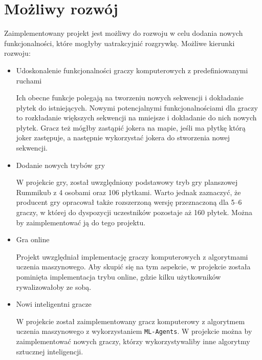 \documentclass[a4paper,twoside,12pt]{book}
\begin{document}
	\section{Możliwy rozwój}%
	Zaimplementowany projekt jest możliwy do rozwoju w celu dodania nowych funkcjonalności, które mogłyby uatrakcyjnić rozgrywkę. Możliwe kierunki rozwoju:
	\begin{itemize}
		\item Udoskonalenie funkcjonalności graczy komputerowych z predefiniowanymi ruchami 
		
		Ich obecne funkcje polegają na tworzeniu nowych sekwencji i dokładanie płytek do istniejących. Nowymi potencjalnymi funkcjonalnościami dla graczy to rozkładanie większych sekwencji na mniejsze i dokładanie do nich nowych płytek. Gracz też mógłby zastąpić jokera na mapie, jeśli ma płytkę którą joker zastępuje, a następnie wykorzystać jokera do stworzenia nowej sekwencji.
		
		\item Dodanie nowych trybów gry
		
		W projekcie gry, został uwzględniony podstawowy tryb gry planszowej Rummikub z 4 osobami oraz 106 płytkami. Warto jednak zaznaczyć, że producent gry opracował także rozszerzoną wersję przeznaczoną dla 5–6 graczy, w której do dyspozycji uczestników pozostaje aż 160 płytek. Można by zaimplementować ją do tego projektu.
		
		\item Gra online
		
		Projekt uwzględniał implementację graczy komputerowych z algorytmami uczenia maszynowego. Aby skupić się na tym aspekcie, w projekcie została pominięta implementacja trybu online, gdzie kilku użytkowników rywalizowałoby ze sobą. 
		\item Nowi inteligentni gracze
		
		W projekcie został zaimplementowany gracz komputerowy z algorytmem uczenia maszynowego z wykorzystaniem \texttt{ML-Agents}. W projekcie można by zaimplementować nowych graczy, którzy wykorzystywaliby inne algorytmy sztucznej inteligencji.
	\end{itemize}
	
	
	
	\backmatter
	
	\printbibliography           %
	
\end{document}
